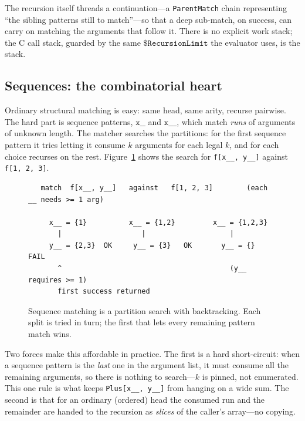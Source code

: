 The recursion itself threads a continuation---a \texttt{ParentMatch} chain
representing ``the sibling patterns still to match''---so that a deep sub-match, on
success, can carry on matching the arguments that follow it. There is no explicit work
stack; the C call stack, guarded by the same \(\mathtt{\$RecursionLimit}\) the
evaluator uses, is the stack.

\subsection*{Sequences: the combinatorial heart}

Ordinary structural matching is easy: same head, same arity, recurse pairwise. The
hard part is sequence patterns, \(\mathtt{x\_\_}\) and \(\mathtt{x\_\_\_}\), which
match \emph{runs} of arguments of unknown length. The matcher searches the partitions:
for the first sequence pattern it tries letting it consume \(k\) arguments for each
legal \(k\), and for each choice recurses on the rest. Figure~\ref{fig:backtrack}
shows the search for \texttt{f[x\_\_, y\_\_]} against \texttt{f[1, 2, 3]}.

\begin{figure}[h]
\begin{framed}
\small
\begin{verbatim}
   match  f[x__, y__]   against   f[1, 2, 3]        (each __ needs >= 1 arg)

     x__ = {1}          x__ = {1,2}         x__ = {1,2,3}
       |                   |                    |
     y__ = {2,3}  OK     y__ = {3}   OK       y__ = {}   FAIL
       ^                                        (y__ requires >= 1)
       first success returned
\end{verbatim}
\end{framed}
\caption{Sequence matching is a partition search with backtracking. Each split is
tried in turn; the first that lets every remaining pattern match wins.}
\label{fig:backtrack}
\end{figure}

Two forces make this affordable in practice. The first is a hard short-circuit: when a
sequence pattern is the \emph{last} one in the argument list, it must consume all the
remaining arguments, so there is nothing to search---\(k\) is pinned, not enumerated.
This one rule is what keeps \texttt{Plus[x\_\_, y\_\_]} from hanging on a wide sum. The
second is that for an ordinary (ordered) head the consumed run and the remainder are
handed to the recursion as \emph{slices} of the caller's array---no copying.

